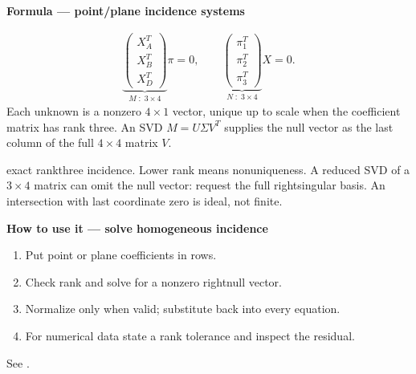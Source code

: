 \documentclass[letterpaper,11pt,english,openany,oneside]{jupyterBook}
\begin{document}
\begin{TextbookBox}
\textbf{Formula — point/plane incidence systems}\par\smallskip
\begin{equation}\label{equation:lectures/lecture01/planes-lines:eq-lec01-plane-null}
\begin{split}\underbrace{\begin{pmatrix}X_A^T\\X_B^T\\X_D^T\end{pmatrix}}_{M\;:\;3\times4}\pi=0,
\qquad
\underbrace{\begin{pmatrix}\pi_1^T\\\pi_2^T\\\pi_3^T\end{pmatrix}}_{N\;:\;3\times4}X=0.\end{split}
\end{equation}
\sphinxAtStartPar
Each unknown is a nonzero \(4\times1\) vector, unique up to scale when the coefficient matrix has rank three. An SVD \(M=U\Sigma V^T\) supplies the null vector as the last column of the full \(4\times4\) matrix \(V\).

\sphinxAtStartPar
{} exact rank\sphinxhyphen{}three incidence. Lower rank means nonuniqueness. A reduced SVD of a \(3\times4\) matrix can omit the null vector: request the full right\sphinxhyphen{}singular basis. An intersection with last coordinate zero is ideal, not finite.

\end{TextbookBox}

\begin{TextbookBox}
\textbf{How to use it — solve homogeneous incidence}\par\smallskip
\begin{enumerate}
%
\item {}
\sphinxAtStartPar
Put point or plane coefficients in rows.

\item {}
\sphinxAtStartPar
Check rank and solve for a nonzero right\sphinxhyphen{}null vector.

\item {}
\sphinxAtStartPar
Normalize only when valid; substitute back into every equation.

\item {}
\sphinxAtStartPar
For numerical data state a rank tolerance and inspect the residual.

\end{enumerate}

\sphinxAtStartPar
See {\hyperref[\detokenize{lectures/lecture01/planes-lines:ex-lec01-null}]{}}.

\end{TextbookBox}
\end{document}
